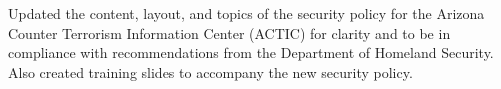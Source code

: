


\begin{rExperience}

  \item Updated the content, layout, and topics of the security policy for the Arizona Counter Terrorism Information Center (ACTIC) for clarity and to be in compliance with recommendations from the Department of Homeland Security. Also created training slides to accompany the new security policy.

\end{rExperience}
